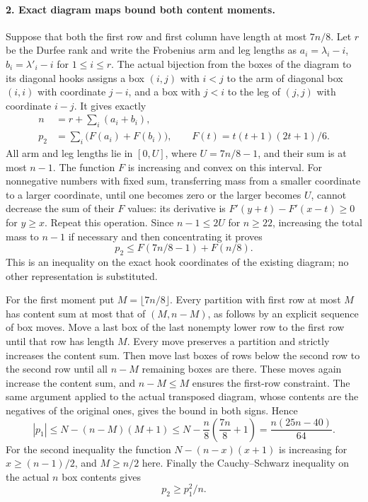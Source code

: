 \paragraph{2. Exact diagram maps bound both content moments.}
Suppose that both the first row and first column have length
at most $7n/8$. Let $r$ be the Durfee rank and write the
Frobenius arm and leg lengths as
$a_i=\lambda_i-i$, $b_i=\lambda'_i-i$ for $1\le i\le r$.
The actual bijection from the boxes of the diagram to its
diagonal hooks assigns a box $(i,j)$ with $i<j$ to the
arm of diagonal box $(i,i)$ with coordinate $j-i$, and
a box with $j<i$ to the leg of $(j,j)$ with coordinate
$i-j$. It gives exactly
\[
\begin{split}
 n&=r+\sum_i(a_i+b_i),\\
 p_2&=\sum_i\bigl(F(a_i)+F(b_i)\bigr),
 \qquad F(t)=t(t+1)(2t+1)/6.
\end{split}
 \tag{F1T28.7}
\]
All arm and leg lengths lie in $[0,U]$, where
$U=7n/8-1$, and their sum is at most $n-1$.
The function $F$ is increasing and convex on this interval.
For nonnegative numbers with fixed sum, transferring mass
from a smaller coordinate to a larger coordinate, until
one becomes zero or the larger becomes $U$, cannot decrease
the sum of their $F$ values: its derivative is
$F'(y+t)-F'(x-t)\ge0$ for $y\ge x$.
Repeat this operation. Since $n-1\le2U$ for $n\ge22$,
increasing the total mass to $n-1$ if necessary and then
concentrating it proves
\[
          p_2\le F(7n/8-1)+F(n/8).
 \tag{F1T28.8}
\]
This is an inequality on the exact hook coordinates of
the existing diagram; no other representation is substituted.

For the first moment put $M=\lfloor7n/8\rfloor$.
Every partition with first row at most $M$ has content
sum at most that of $(M,n-M)$, as follows by an explicit
sequence of box moves. Move a last box of the last nonempty
lower row to the first row until that row has length $M$.
Every move preserves a partition and strictly increases
the content sum. Then move last boxes of rows below the
second row to the second row until all $n-M$ remaining
boxes are there. These moves again increase the content
sum, and $n-M\le M$ ensures the first-row constraint.
The same argument applied to the actual transposed diagram,
whose contents are the negatives of the original ones, gives
the bound in both signs. Hence
\[
 |p_1|\le N-(n-M)(M+1)
       \le N-\frac n8\left(\frac{7n}8+1\right)
       =\frac{n(25n-40)}{64}.
 \tag{F1T28.9}
\]
For the second inequality the function
$N-(n-x)(x+1)$ is increasing for $x\ge(n-1)/2$,
and $M\ge n/2$ here.
Finally the Cauchy--Schwarz inequality on the actual
$n$ box contents gives
\[
                              p_2\ge p_1^2/n.
 \tag{F1T28.10}
\]

